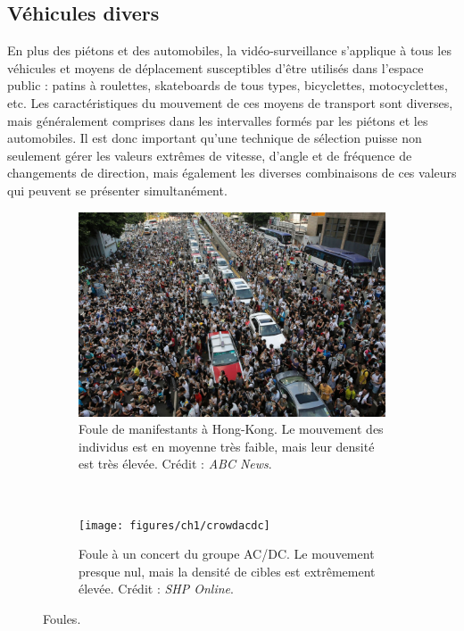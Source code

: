 	\FloatBarrier \subsection{Véhicules divers}
	En plus des piétons et des automobiles, la vidéo-surveillance s'applique à tous les véhicules et moyens de déplacement susceptibles d'être utilisés dans l'espace public : patins à roulettes, skateboards de tous types, bicyclettes, motocyclettes, etc. Les caractéristiques du mouvement de ces moyens de transport sont diverses, mais généralement comprises dans les intervalles formés par les piétons et les automobiles. Il est donc important qu'une technique de sélection puisse non seulement gérer les valeurs extrêmes de vitesse, d'angle et de fréquence de changements de direction, mais également les diverses combinaisons de ces valeurs qui peuvent se présenter simultanément.
		
	\begin{figure}[!htbp]
		\begin{subfigure}[t]{0.49\textwidth}
			\centering
			\includegraphics[width=\textwidth]{figures/ch1/crowdhk}
			\caption[Foule de manifestants à Hong-Kong]{Foule de manifestants à Hong-Kong. Le mouvement des individus est en moyenne très faible, mais leur densité est très élevée. Crédit : \emph{ABC News}.}
			\label{fig:crowdhk}
		\end{subfigure}
		~
		\begin{subfigure}[t]{0.49\textwidth}
			\centering
			\texttt{[image: figures/ch1/crowdacdc]}
			\caption[Foule à un concert]{Foule à un concert du groupe AC/DC. Le mouvement presque nul, mais la densité de cibles est extrêmement élevée. Crédit : \emph{SHP Online}\footnotemark.}
			\label{fig:crowdacdc}
		\end{subfigure}
		\label{fig:crowds}
		\caption{Foules.}
	\end{figure}
	

